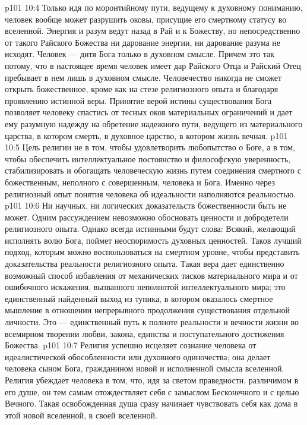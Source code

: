 \vs p101 10:4 Только идя по моронтийному пути, ведущему к духовному пониманию, человек вообще может разрушить оковы, присущие его смертному статусу во вселенной. Энергия и разум ведут назад в Рай и к Божеству, но непосредственно от такого Райского Божества ни дарование энергии, ни дарование разума не исходят. Человек --- дитя Бога только в духовном смысле. Причем это так потому, что в настоящее время человек имеет дар Райского Отца и Райский Отец пребывает в нем лишь в духовном смысле. Человечество никогда не сможет открыть божественное, кроме как на стезе религиозного опыта и благодаря проявлению истинной веры. Принятие верой истины существования Бога позволяет человеку спастись от тесных оков материальных ограничений и дает ему разумную надежду на обретение надежного пути, ведущего из материального царства, в котором смерть, в духовное царство, в котором жизнь вечная.
\vs p101 10:5 \pc Цель религии не в том, чтобы удовлетворить любопытство о Боге, а в том, чтобы обеспечить интеллектуальное постоянство и философскую уверенность, стабилизировать и обогащать человеческую жизнь путем соединения смертного с божественным, неполного с совершенным, человека и Бога. Именно через религиозный опыт понятия человека об идеальности наполняются реальностью.
\vs p101 10:6 \pc Ни научных, ни логических доказательств божественности быть не может. Одним рассуждением невозможно обосновать ценности и добродетели религиозного опыта. Однако всегда истинными будут слова: Всякий, желающий исполнять волю Бога, поймет неоспоримость духовных ценностей. Таков лучший подход, которым можно воспользоваться на смертном уровне, чтобы представить доказательства реальности религиозного опыта. Такая вера дает единственно возможный способ избавления от механических тисков материального мира и от ошибочного искажения, вызванного неполнотой интеллектуального мира; это единственный найденный выход из тупика, в котором оказалось смертное мышление в отношении непрерывного продолжения существования отдельной личности. Это --- единственный путь к полноте реальности и вечности жизни во всемирном творении любви, закона, единства и поступательного достижения Божества.
\vs p101 10:7 Религия успешно исцеляет сознание человека от идеалистической обособленности или духовного одиночества; она делает человека сыном Бога, гражданином новой и исполненной смысла вселенной. Религия убеждает человека в том, что, идя за светом праведности, различимом в его душе, он тем самым отождествляет себя с замыслом Бесконечного и с целью Вечного. Такая освобожденная душа сразу начинает чувствовать себя как дома в этой новой вселенной, в своей вселенной.
